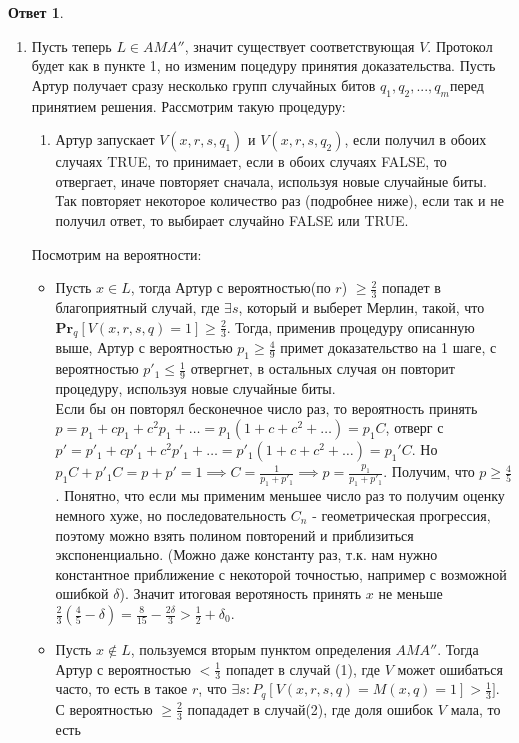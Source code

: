 \documentclass[a4paper]{article}
\theoremstyle{plain}
\theoremstyle{definition}
\newtheorem*{answer}{Ответ}
\begin{document}
\begin{answer}
\begin{enumerate}
\begin{enumerate}
    \item Пусть теперь $L \in AMA''$, значит существует соответствующая $V$. Протокол будет как в пункте 1, но изменим 
    поцедуру принятия доказательства. Пусть Артур получает сразу несколько групп случайных битов $q_1,q_2,...,q_m$перед принятием решения. Рассмотрим такую процедуру:
    \begin{enumerate}
    \item Артур запускает $V(x,r,s,q_1)$ и $V(x,r,s,q_2)$, если получил в обоих случаях TRUE, то принимает, если 
    в обоих случаях FALSE, то отвергает, иначе повторяет сначала, используя новые случайные биты. Так повторяет некоторое количество раз (подробнее ниже), если так и не получил ответ, то выбирает случайно FALSE или TRUE.
    \end{enumerate}
    Посмотрим на вероятности: 
    \begin{itemize}
    \item Пусть $x \in L$, тогда Артур с вероятностью(по $r$) $\geq \frac{2}{3}$ попадет в благоприятный случай, где $\exists s$, который и выберет Мерлин, такой, что  $\mathbf{Pr}_q [V(x,r,s,q)=1] \geq \frac{2}{3}$. Тогда, применив процедуру описанную выше, Артур с вероятностью $p_1\geq \frac{4}{9}$ примет доказательство на 1 шаге, с вероятностью $p'_1 \leq \frac{1}{9}$ отвергнет, в остальных случая он повторит процедуру, используя новые случайные биты. \\
    Если бы он повторял бесконечное число раз, то вероятность принять $p = p_1 + cp_1 + c^2p_1 + \ldots = p_1(1 + c + c^2 + \ldots) = p_1C$, отверг с $p' = p'_1 + cp'_1 + c^2p'_1 + \ldots = p'_1(1 + c + c^2 + \ldots) = p_1'C$. Но $p_1C + p'_1C = p + p' = 1 \implies C = \frac{1}{p_1 + p'_1} \implies p = \frac{p_1}{p_1 + p'_1}$. Получим, что $p \geq \frac{4}{5}$. Понятно, что если мы применим меньшее число раз то получим оценку немного хуже, но последовательность $C_n$ - геометрическая прогрессия, поэтому можно взять полином повторений и приблизиться экспоненциально. (Можно даже константу раз, т.к. нам нужно константное приближение с некоторой точностью, например с возможной ошибкой $\delta$). Значит итоговая веротяность принять $x$ не меньше $\frac{2}{3}(\frac{4}{5} - \delta) = \frac{8}{15} - \frac{2\delta}{3} > \frac{1}{2} + \delta_0$.
    \item Пусть $x \notin L$, пользуемся вторым пунктом определения $AMA''$. Тогда Артур с вероятностью $ < \frac{1}{3}$ попадет в случай (1), где $V$ может ошибаться часто, то есть в такое $r$, что $\exists s : P_q[V(x,r,s,q) = M(x,q) = 1] > \frac{1}{3}]$. С вероятностью $\geq \frac{2}{3}$ попададет в случай(2), где доля ошибок $V$ мала, то есть 

\end{itemize}
\end{enumerate}
\end{enumerate}
\end{answer}
\end{document}
